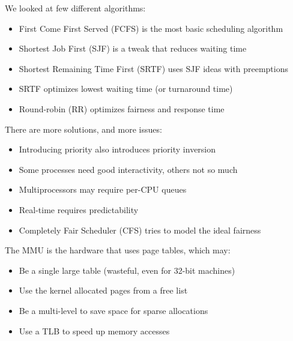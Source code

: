   \begin{slide}


    We looked at few different algorithms:

    \begin{itemize}
      \item First Come First Served (FCFS) is the most basic scheduling algorithm
      \item Shortest Job First (SJF) is a tweak that reduces waiting time
      \item Shortest Remaining Time First (SRTF) uses SJF ideas with preemptions
      \item SRTF optimizes lowest waiting time (or turnaround time)
      \item Round-robin (RR) optimizes fairness and response time
    \end{itemize}

  \end{slide}

  \begin{slide}


    There are more solutions, and more issues:

    \begin{itemize}
      \item Introducing priority also introduces priority inversion
      \item Some processes need good interactivity, others not so much
      \item Multiprocessors may require per-CPU queues
      \item Real-time requires predictability
      \item Completely Fair Scheduler (CFS) tries to model the ideal fairness
    \end{itemize}

  \end{slide}

  \begin{slide}


    The MMU is the hardware that uses page tables, which may:
    \begin{itemize}
      \item Be a single large table (wasteful, even for 32-bit machines)
      \item Use the kernel allocated pages from a free list
      \item Be a multi-level to save space for sparse allocations
      \item Use a TLB to speed up memory accesses
    \end{itemize}

  \end{slide}

